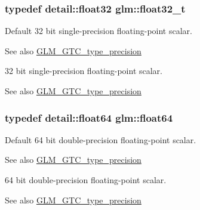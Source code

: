 \subsubsection[{float32\+\_\+t}]{\setlength{\rightskip}{0pt plus 5cm}typedef detail\+::float32 {\bf glm\+::float32\+\_\+t}}\label{group__gtc__type__precision_ga642737ae3e7c434b366f2191e6944bf2}
Default 32 bit single-\/precision floating-\/point scalar. \begin{DoxySeeAlso}{See also}
\hyperlink{group__gtc__type__precision}{G\+L\+M\+\_\+\+G\+T\+C\+\_\+type\+\_\+precision}
\end{DoxySeeAlso}
32 bit single-\/precision floating-\/point scalar. \begin{DoxySeeAlso}{See also}
\hyperlink{group__gtc__type__precision}{G\+L\+M\+\_\+\+G\+T\+C\+\_\+type\+\_\+precision} 
\end{DoxySeeAlso}
\hypertarget{group__gtc__type__precision_gab721f828b41f46b20cf4883b50733d3b}{}
\subsubsection[{float64}]{\setlength{\rightskip}{0pt plus 5cm}typedef detail\+::float64 {\bf glm\+::float64}}\label{group__gtc__type__precision_gab721f828b41f46b20cf4883b50733d3b}
Default 64 bit double-\/precision floating-\/point scalar. \begin{DoxySeeAlso}{See also}
\hyperlink{group__gtc__type__precision}{G\+L\+M\+\_\+\+G\+T\+C\+\_\+type\+\_\+precision}
\end{DoxySeeAlso}
64 bit double-\/precision floating-\/point scalar. \begin{DoxySeeAlso}{See also}
\hyperlink{group__gtc__type__precision}{G\+L\+M\+\_\+\+G\+T\+C\+\_\+type\+\_\+precision} 
\end{DoxySeeAlso}
\hypertarget{group__gtc__type__precision_gade966a3eb25ebeb16dd53c40d3fdeb46}{}
